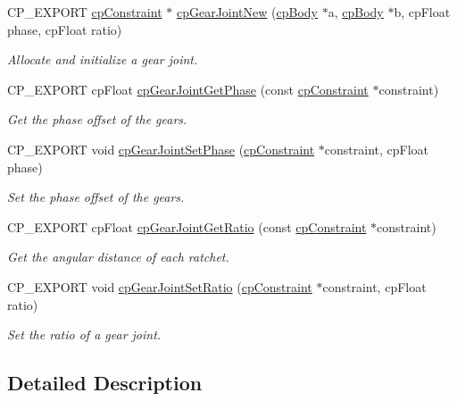 \begin{DoxyCompactItemize}
C\+P\+\_\+\+E\+X\+P\+O\+RT \hyperlink{structcpConstraint}{cp\+Constraint} $\ast$ \hyperlink{group__cpGearJoint_ga5da02bb929c46c9c9aadfc6b2952a75e}{cp\+Gear\+Joint\+New} (\hyperlink{structcpBody}{cp\+Body} $\ast$a, \hyperlink{structcpBody}{cp\+Body} $\ast$b, cp\+Float phase, cp\+Float ratio)
\begin{DoxyCompactList}\small\item\em Allocate and initialize a gear joint. \end{DoxyCompactList}\item 
\mbox{\label{group__cpGearJoint_ga48c460709467b86a7e3209bfdcfca6a0}} 
C\+P\+\_\+\+E\+X\+P\+O\+RT cp\+Float \hyperlink{group__cpGearJoint_ga48c460709467b86a7e3209bfdcfca6a0}{cp\+Gear\+Joint\+Get\+Phase} (const \hyperlink{structcpConstraint}{cp\+Constraint} $\ast$constraint)
\begin{DoxyCompactList}\small\item\em Get the phase offset of the gears. \end{DoxyCompactList}\item 
\mbox{\label{group__cpGearJoint_gabdbf2950090d65df36ffff002d6e929d}} 
C\+P\+\_\+\+E\+X\+P\+O\+RT void \hyperlink{group__cpGearJoint_gabdbf2950090d65df36ffff002d6e929d}{cp\+Gear\+Joint\+Set\+Phase} (\hyperlink{structcpConstraint}{cp\+Constraint} $\ast$constraint, cp\+Float phase)
\begin{DoxyCompactList}\small\item\em Set the phase offset of the gears. \end{DoxyCompactList}\item 
\mbox{\label{group__cpGearJoint_ga2eedbb00537bc98ec8eea4bf1b3439b6}} 
C\+P\+\_\+\+E\+X\+P\+O\+RT cp\+Float \hyperlink{group__cpGearJoint_ga2eedbb00537bc98ec8eea4bf1b3439b6}{cp\+Gear\+Joint\+Get\+Ratio} (const \hyperlink{structcpConstraint}{cp\+Constraint} $\ast$constraint)
\begin{DoxyCompactList}\small\item\em Get the angular distance of each ratchet. \end{DoxyCompactList}\item 
\mbox{\label{group__cpGearJoint_ga75362fa5be36c30d3006be55b1646b73}} 
C\+P\+\_\+\+E\+X\+P\+O\+RT void \hyperlink{group__cpGearJoint_ga75362fa5be36c30d3006be55b1646b73}{cp\+Gear\+Joint\+Set\+Ratio} (\hyperlink{structcpConstraint}{cp\+Constraint} $\ast$constraint, cp\+Float ratio)
\begin{DoxyCompactList}\small\item\em Set the ratio of a gear joint. \end{DoxyCompactList}\end{DoxyCompactItemize}


\subsection{Detailed Description}
